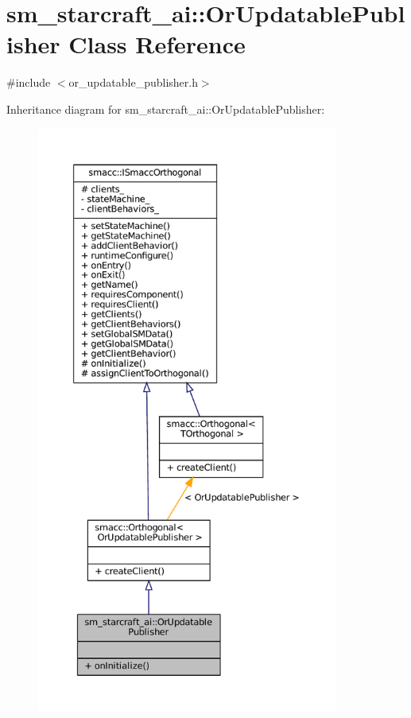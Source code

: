 \hypertarget{classsm__starcraft__ai_1_1OrUpdatablePublisher}{}\section{sm\+\_\+starcraft\+\_\+ai\+:\+:Or\+Updatable\+Publisher Class Reference}
\label{classsm__starcraft__ai_1_1OrUpdatablePublisher}


{\ttfamily \#include $<$or\+\_\+updatable\+\_\+publisher.\+h$>$}



Inheritance diagram for sm\+\_\+starcraft\+\_\+ai\+:\+:Or\+Updatable\+Publisher\+:
\nopagebreak
\begin{figure}[H]
\begin{center}
\leavevmode
\includegraphics[height=550pt]{classsm__starcraft__ai_1_1OrUpdatablePublisher__inherit__graph}
\end{center}
\end{figure}


